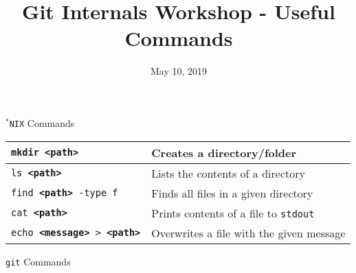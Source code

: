 \documentclass[a4paper]{article}
\title{Git Internals Workshop - Useful Commands}
\date{May 10, 2019}
\begin{document}
\maketitle

{\Large \texttt{$^*$NIX} Commands}

\begin{tabular}{ l l }
  \texttt{mkdir \textbf{<path>}} & Creates a directory/folder \\
  \hline
  \texttt{ls \textbf{<path>}} & Lists the contents of a directory \\
  \hline
  \texttt{find \textbf{<path>} -type f} & Finds all files in a given directory \\
  \hline
  \texttt{cat \textbf{<path>}} & Prints contents of a file to \texttt{stdout} \\
  \hline
  \texttt{echo \textbf{<message>} > \textbf{<path>}} &
    Overwrites a file with the given message \\
  \hline
\end{tabular}

\vspace{0.5in}

{\Large \texttt{git} Commands}
\end{document}
